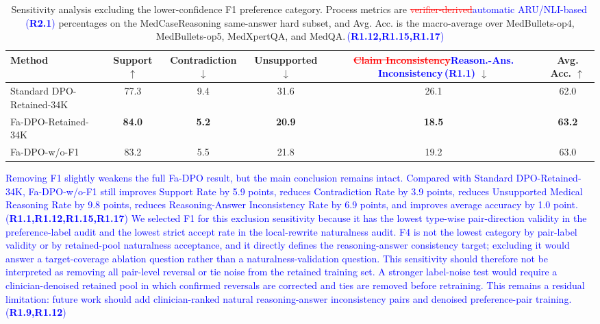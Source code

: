 \documentclass[a4paper,fleqn,doubleblind]{cas-sc}
\DeclareRobustCommand{\deleted}[1]{\textcolor{red}{\sout{#1}}}
\DeclareRobustCommand{\added}[1]{\textcolor{blue}{#1}}
\DeclareRobustCommand{\revtag}[1]{\textcolor{blue}{\scriptsize\,(\textbf{#1})}}
\begin{document}
\begin{table}[htbp]
    \centering
    \begingroup\color{blue}
    \footnotesize
    \caption{Sensitivity analysis excluding the lower-confidence F1 preference category. Process metrics are \deleted{verifier-derived}\added{automatic ARU/NLI-based}\revtag{R2.1} percentages on the MedCaseReasoning same-answer hard subset, and Avg. Acc. is the macro-average over MedBullets-op4, MedBullets-op5, MedXpertQA, and MedQA.\revtag{R1.12,R1.15,R1.17}}
    \label{tab:f1_exclusion_sensitivity}
    \begin{tabular}{lccccc}
        \toprule
        \textbf{Method} & \textbf{Support $\uparrow$} & \textbf{Contradiction $\downarrow$} & \textbf{Unsupported $\downarrow$} & \textbf{\deleted{Claim Inconsistency}\added{Reason.-Ans. Inconsistency}\revtag{R1.1} $\downarrow$} & \textbf{Avg. Acc. $\uparrow$} \\
        \midrule
        Standard DPO-Retained-34K & 77.3 & 9.4 & 31.6 & 26.1 & 62.0 \\
        Fa-DPO-Retained-34K & \textbf{84.0} & \textbf{5.2} & \textbf{20.9} & \textbf{18.5} & \textbf{63.2} \\
        Fa-DPO-w/o-F1 & 83.2 & 5.5 & 21.8 & 19.2 & 63.0 \\
        \bottomrule
    \end{tabular}
    \endgroup
\end{table}

\added{Removing F1 slightly weakens the full Fa-DPO result, but the main conclusion remains intact. Compared with Standard DPO-Retained-34K, Fa-DPO-w/o-F1 still improves Support Rate by 5.9 points, reduces Contradiction Rate by 3.9 points, reduces Unsupported Medical Reasoning Rate by 9.8 points, reduces Reasoning-Answer Inconsistency Rate by 6.9 points, and improves average accuracy by 1.0 point.}\revtag{R1.1,R1.12,R1.15,R1.17} \added{We selected F1 for this exclusion sensitivity because it has the lowest type-wise pair-direction validity in the preference-label audit and the lowest strict accept rate in the local-rewrite naturalness audit. F4 is not the lowest category by pair-label validity or by retained-pool naturalness acceptance, and it directly defines the reasoning-answer consistency target; excluding it would answer a target-coverage ablation question rather than a naturalness-validation question. This sensitivity should therefore not be interpreted as removing all pair-level reversal or tie noise from the retained training set. A stronger label-noise test would require a clinician-denoised retained pool in which confirmed reversals are corrected and ties are removed before retraining. This remains a residual limitation: future work should add clinician-ranked natural reasoning-answer inconsistency pairs and denoised preference-pair training.}\revtag{R1.9,R1.12}
\end{document}
